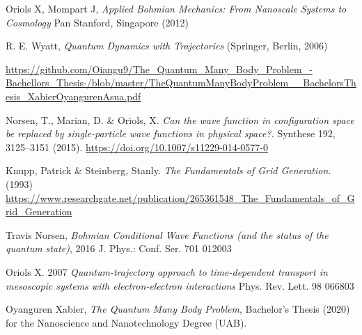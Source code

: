 \documentclass[11pt, a4paper]{article} %
\begin{document}
\begin{thebibliography}{1}

	Oriols X, Mompart J, {\em Applied Bohmian Mechanics: From Nanoscale Systems to Cosmology} Pan Stanford, Singapore (2012)
	

R. E. Wyatt, {\em Quantum Dynamics with Trajectories} (Springer, Berlin, 2006)


\href{https://github.com/Oiangu9/The\_Quantum\_Many\_Body\_Problem\_-Bachellors\_Thesis-/blob/master/TheQuantumManyBodyProblem\_\_BachelorsThesis\_XabierOyangurenAsua.pdf}{https://github.com/Oiangu9/The\_Quantum\_Many\_Body\_Problem\_-Bachellors\_Thesis-/blob/master/TheQuantumManyBodyProblem\_\_BachelorsThesis\_XabierOyangurenAsua.pdf}

Norsen, T., Marian, D. \& Oriols, X. {\em Can the wave function in configuration space be replaced by single-particle wave functions in physical space?.} Synthese 192, 3125–3151 (2015). \href{https://doi.org/10.1007/s11229-014-0577-0}{https://doi.org/10.1007/s11229-014-0577-0}


Knupp, Patrick \& Steinberg, Stanly. {\em The Fundamentals of Grid Generation.} (1993) \href{https://www.researchgate.net/publication/265361548_The_Fundamentals_of_Grid_Generation}{https://www.researchgate.net/publication/265361548\_The\_Fundamentals\_of\_Grid\_Generation} 

Travis Norsen, {\em Bohmian Conditional Wave Functions (and the status of the quantum state)}, 2016 J. Phys.: Conf. Ser. 701 012003

	Oriols X. 2007 {\em Quantum-trajectory approach to time-dependent transport in mesoscopic systems with electron-electron interactions} Phys. Rev. Lett. 98 066803
	
	Oyanguren Xabier, {\em The Quantum Many Body Problem}, Bachelor's Thesis (2020) for the Nanoscience and Nanotechnology Degree (UAB).


\end{thebibliography}
\end{document}
